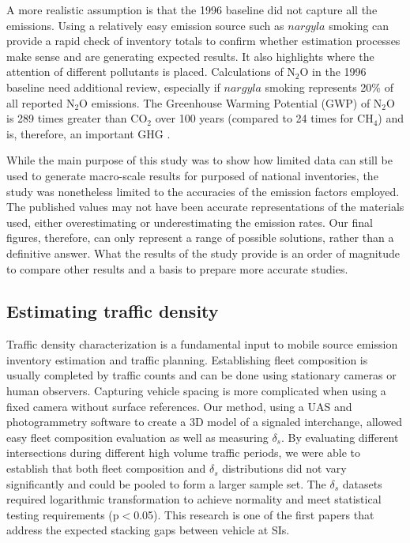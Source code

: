 A more realistic assumption is that the 1996 baseline did not capture all the emissions. Using a relatively easy emission source such as $nargyla$ smoking can provide a rapid check of inventory totals to confirm whether estimation processes make sense and are generating expected results. It also highlights where the attention of different pollutants is placed.  Calculations of N$_{2}$O in the 1996 baseline need additional review, especially if $nargyla$ smoking represents 20\% of all reported N$_{2}$O emissions.  The Greenhouse Warming Potential (GWP) of N$_{2}$O is 289 times greater than CO$_{2}$ over 100 years (compared to 24 times for CH$_{4}$)  and is, therefore, an important GHG \citep{IPCC2007}.

While the main purpose of this study was to show how limited data can still be used to generate macro-scale results for purposed of national inventories, the study was nonetheless limited to the accuracies of the emission factors employed.  The published values may not have been accurate representations of the materials used, either overestimating or underestimating the emission rates. Our final figures, therefore, can only represent a range of possible solutions, rather than a definitive answer.  What the results of the study provide is an order of magnitude to compare other results and a basis to prepare more accurate studies.

\subsection{Estimating traffic density}

Traffic density characterization is a fundamental input to mobile source emission inventory estimation and traffic planning. Establishing fleet composition is usually completed by traffic counts and can be done using stationary cameras or human observers. Capturing vehicle spacing is more complicated when using a fixed camera without surface references. Our method, using a UAS and photogrammetry software to create a 3D model of a signaled interchange, allowed easy fleet composition evaluation as well as measuring $\delta_{s}$. By evaluating different intersections during different high volume traffic periods, we were able to establish that both fleet composition and $\delta_{s}$ distributions did not vary significantly and could be pooled to form a larger sample set. The $\delta_{s}$ datasets required logarithmic transformation to achieve normality and meet statistical testing requirements (p$<$0.05). This research is one of the first papers that address the expected stacking gaps between vehicle at SIs.

